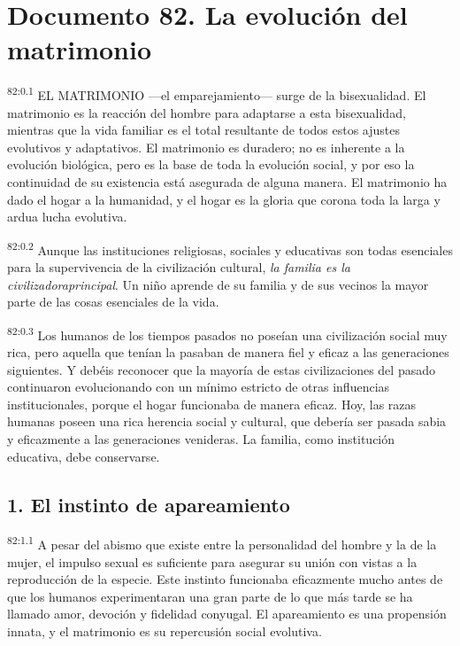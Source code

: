 \chapter{Documento 82. La evolución del matrimonio}
\par
\textsuperscript{82:0.1} EL MATRIMONIO ---el emparejamiento--- surge de la bisexualidad. El matrimonio es la reacción del hombre para adaptarse a esta bisexualidad, mientras que la vida familiar es el total resultante de todos estos ajustes evolutivos y adaptativos. El matrimonio es duradero; no es inherente a la evolución biológica, pero es la base de toda la evolución social, y por eso la continuidad de su existencia está asegurada de alguna manera. El matrimonio ha dado el hogar a la humanidad, y el hogar es la gloria que corona toda la larga y ardua lucha evolutiva.

\par
\textsuperscript{82:0.2} Aunque las instituciones religiosas, sociales y educativas son todas esenciales para la supervivencia de la civilización cultural, \textit{la familia es la civilizadoraprincipal}. Un niño aprende de su familia y de sus vecinos la mayor parte de las cosas esenciales de la vida.

\par
\textsuperscript{82:0.3} Los humanos de los tiempos pasados no poseían una civilización social muy rica, pero aquella que tenían la pasaban de manera fiel y eficaz a las generaciones siguientes. Y debéis reconocer que la mayoría de estas civilizaciones del pasado continuaron evolucionando con un mínimo estricto de otras influencias institucionales, porque el hogar funcionaba de manera eficaz. Hoy, las razas humanas poseen una rica herencia social y cultural, que debería ser pasada sabia y eficazmente a las generaciones venideras. La familia, como institución educativa, debe conservarse.

\section*{1. El instinto de apareamiento}
\par
\textsuperscript{82:1.1} A pesar del abismo que existe entre la personalidad del hombre y la de la mujer, el impulso sexual es suficiente para asegurar su unión con vistas a la reproducción de la especie. Este instinto funcionaba eficazmente mucho antes de que los humanos experimentaran una gran parte de lo que más tarde se ha llamado amor, devoción y fidelidad conyugal. El apareamiento es una propensión innata, y el matrimonio es su repercusión social evolutiva.

